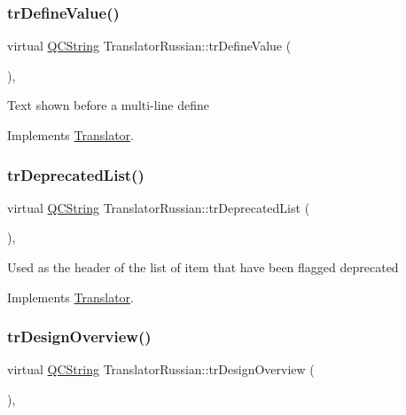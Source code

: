 \subsubsection{\texorpdfstring{trDefineValue()}{trDefineValue()}}
{\footnotesize\ttfamily virtual \mbox{\hyperlink{class_q_c_string}{Q\+C\+String}} Translator\+Russian\+::tr\+Define\+Value (\begin{DoxyParamCaption}{ }\end{DoxyParamCaption})\hspace{0.3cm}{\ttfamily [inline]}, {\ttfamily [virtual]}}

Text shown before a multi-\/line define 

Implements \mbox{\hyperlink{class_translator}{Translator}}.

\mbox{\label{class_translator_russian_acb7a9801b14cacf9468d5b92d8b28625}} 
\subsubsection{\texorpdfstring{trDeprecatedList()}{trDeprecatedList()}}
{\footnotesize\ttfamily virtual \mbox{\hyperlink{class_q_c_string}{Q\+C\+String}} Translator\+Russian\+::tr\+Deprecated\+List (\begin{DoxyParamCaption}{ }\end{DoxyParamCaption})\hspace{0.3cm}{\ttfamily [inline]}, {\ttfamily [virtual]}}

Used as the header of the list of item that have been flagged deprecated 

Implements \mbox{\hyperlink{class_translator}{Translator}}.

\mbox{\label{class_translator_russian_ab165483620a267e2fd392ff06d0e9f39}} 
\subsubsection{\texorpdfstring{trDesignOverview()}{trDesignOverview()}}
{\footnotesize\ttfamily virtual \mbox{\hyperlink{class_q_c_string}{Q\+C\+String}} Translator\+Russian\+::tr\+Design\+Overview (\begin{DoxyParamCaption}{ }\end{DoxyParamCaption})\hspace{0.3cm}{\ttfamily [inline]}, {\ttfamily [virtual]}}

